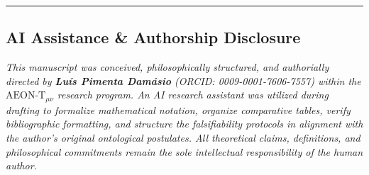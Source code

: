\documentclass[
]{article}
\begin{document}
\begin{center}\rule{0.5\linewidth}{0.5pt}\end{center}

\subsection{AI Assistance \& Authorship
Disclosure}\label{ai-assistance-authorship-disclosure}

\emph{This manuscript was conceived, philosophically structured, and
authorially directed by \textbf{Luís Pimenta Damásio} (ORCID:
0009-0001-7606-7557) within the \(\text{AEON-T}_{\mu\nu}\) research
program. An AI research assistant was utilized during drafting to
formalize mathematical notation, organize comparative tables, verify
bibliographic formatting, and structure the falsifiability protocols in
alignment with the author's original ontological postulates. All
theoretical claims, definitions, and philosophical commitments remain
the sole intellectual responsibility of the human author.}
\end{document}
